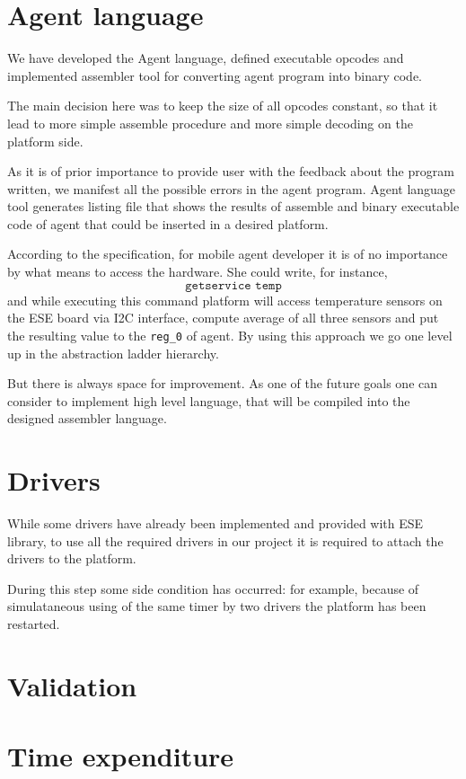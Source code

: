 \documentclass{scrreprt}
\begin{document}
\section{Agent language}

We have developed the Agent language, defined executable opcodes and implemented
 assembler tool for  converting agent program 
into binary code.

The main decision here was to keep the size of all opcodes constant,
so that it lead to more simple assemble procedure and more simple decoding
on the platform side.

As it is of prior importance to provide user with the feedback about the 
program written, we manifest all the possible errors in the agent program.
Agent language tool generates listing file that shows the results of assemble and 
binary executable code of agent that could be inserted in a desired platform.

According to the specification, for mobile agent developer it is of no importance
by what means to access the hardware. She could write, for instance,
\[
\texttt{getservice temp}
\]
and while executing this command platform will access temperature
sensors on the ESE board via I2C interface, compute average of all three sensors and 
put the resulting value to the \texttt{reg_0} of agent.
By using this approach we go one level up in the abstraction ladder hierarchy.


But there is always space for improvement. As one of the future goals one 
can consider to implement high level language, that will be compiled 
into the designed assembler language.

\section{Drivers}

While some drivers have already been implemented and provided with ESE library,
to use all the required drivers in our project it is required to attach 
the drivers to the platform.

During this step some side condition has occurred:
for example, because of simulataneous using of the same
timer by two drivers the platform has been restarted.


\section{Validation}

\section{Time expenditure}
\end{document}

